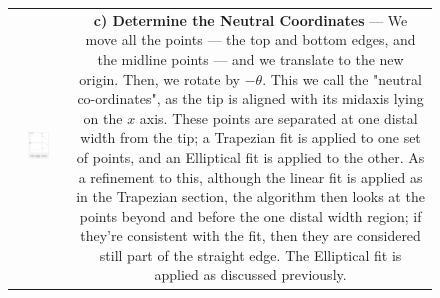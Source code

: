 \begin{figure}[p!]
\begin{tabular}{cc}
    \\ 
   \includegraphics[width=0.45\textwidth, height=0.5\textwidth]{Chapter4/Figs/Model_NeutralCoords_FSkin_Ring.jpg} &
    \parbox[b][0.5\textwidth][s]{0.55\textwidth}{
         \textbf{c) Determine the Neutral Coordinates} --- We move all the points --- the top and bottom edges, and the midline points --- and we translate to the new origin. Then, we rotate by $-\theta$. This we call the "neutral co-ordinates", as the tip is aligned with its midaxis lying on the $x$ axis. These points are separated at one distal width from the tip; a Trapezian fit is applied to one set of points, and an Elliptical fit is applied to the other. As a refinement to this, although the linear fit is applied as in the Trapezian section, the algorithm then looks at the points beyond and before the one distal width region; if they're consistent with the fit, then they are considered still part of the straight edge. The Elliptical fit is applied as discussed previously. \vfill
    }
    \end{tabular}\\
\end{figure}
\addtocounter{figure}{-1}

